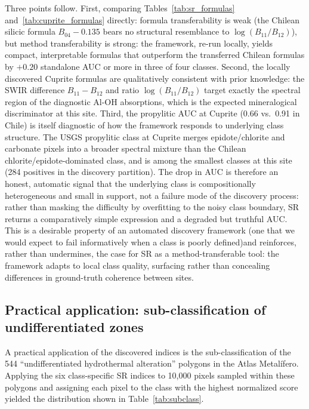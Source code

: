 \documentclass[preprint,authoryear,number]{elsarticle}
\begin{document}
Three points follow. First, comparing Tables~\ref{tab:sr_formulas} and~\ref{tab:cuprite_formulas} directly: formula transferability is weak (the Chilean silicic formula $B_{04}-0.135$ bears no structural resemblance to $\log(B_{11}/B_{12})$), but method transferability is strong: the framework, re-run locally, yields compact, interpretable formulas that outperform the transferred Chilean formulas by $+0.20$ standalone AUC or more in three of four classes. Second, the locally discovered Cuprite formulas are qualitatively consistent with prior knowledge: the SWIR difference $B_{11}-B_{12}$ and ratio $\log(B_{11}/B_{12})$ target exactly the spectral region of the diagnostic Al-OH absorptions, which is the expected mineralogical discriminator at this site. Third, the propylitic AUC at Cuprite (0.66 vs.\ 0.91 in Chile) is itself diagnostic of how the framework responds to underlying class structure. The USGS propylitic class at Cuprite merges epidote/chlorite and carbonate pixels into a broader spectral mixture than the Chilean chlorite/epidote-dominated class, and is among the smallest classes at this site (284 positives in the discovery partition). The drop in AUC is therefore an honest, automatic signal that the underlying class is compositionally heterogeneous and small in support, not a failure mode of the discovery process: rather than masking the difficulty by overfitting to the noisy class boundary, SR returns a comparatively simple expression and a degraded but truthful AUC. This is a desirable property of an automated discovery framework (one that we would expect to fail informatively when a class is poorly defined)and reinforces, rather than undermines, the case for SR as a method-transferable tool: the framework adapts to local class quality, surfacing rather than concealing differences in ground-truth coherence between sites.

\subsection{Practical application: sub-classification of undifferentiated zones}

A practical application of the discovered indices is the sub-classification of the 544 ``undifferentiated hydrothermal alteration'' polygons in the Atlas Metal\'ifero. Applying the six class-specific SR indices to 10{,}000 pixels sampled within these polygons and assigning each pixel to the class with the highest normalized score yielded the distribution shown in Table~\ref{tab:subclass}.
\end{document}
